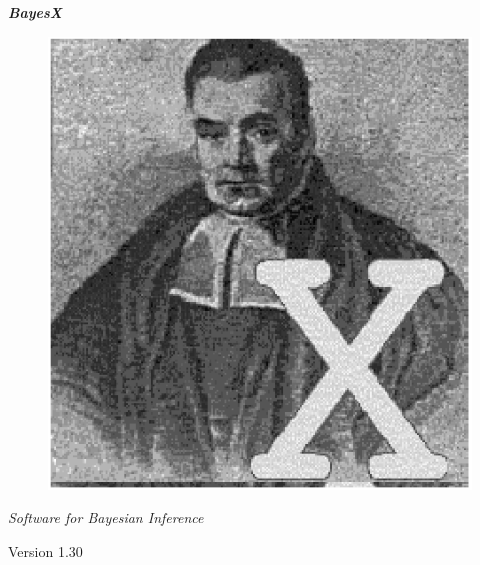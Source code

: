 \vspace{7cm}

\thispagestyle{empty}

\begin{center}
{\bf \em \huge Bayes{\Huge X}} \\

\vspace{0.5cm}

\begin{figure}[h]
\begin{center}
\includegraphics[scale=1.2]{grafiken/bayesicon.eps}
\end{center}
\end{figure}


{\em Software for Bayesian Inference}


\vspace{1cm}

Version 1.30 \\

\vspace{0.7cm}
\end{center}

